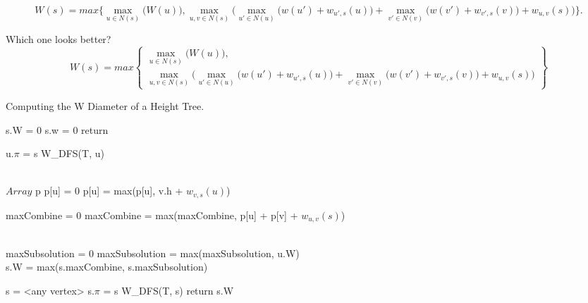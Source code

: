 $$ W(s) = max\Bigg\{ \max\limits_{u \in N(s)}\bigg(W(u)\bigg), \max\limits_{u, v \in N(s)}\bigg( \max\limits_{u' \in N(u)}\Big(w(u') + w_{u', s}(u)\Big) + \max\limits_{v' \in N(v)}\Big(w(v') + w_{v', s}(v)\Big) + w_{u, v}(s)\bigg) \Bigg\}. $$


Which one looks better?
$$
W(s) = max
\left\{
	\begin{array}{ll}
                \max\limits_{u \in N(s)}\bigg(W(u)\bigg),\\
                \max\limits_{u, v \in N(s)}\bigg( \max\limits_{u' \in N(u)}\Big(w(u') + w_{u', s}(u)\Big) + \max\limits_{v' \in N(v)}\Big(w(v') + w_{v', s}(v)\Big) + w_{u, v}(s)\bigg)
	\end{array}
\right\}
$$

\begin{algorithm}
\caption{Computing the W Diameter of a Height Tree.}

\begin{algorithmic}[1]


        \State s.W = 0
        \State s.w = 0
        \State return
    \EndIf

            \State u.$\pi$ = s
            \State W\_DFS(T, u)
        \EndIf
    \EndFor

    \\
    \State $Array$ p
        \State p[u] = 0
            \State p[u] = max(p[u], v.h + $w_{v, s}(u)$) 
        \EndFor
    \EndFor

    \State maxCombine = 0
        \State maxCombine = max(maxCombine, p[u] + p[v] + $w_{u, v}(s)$)
        \EndFor
    \EndFor

    \\
    \State maxSubsolution = 0
        \State maxSubsolution = max(maxSubsolution, u.W)
    \EndFor
    \\
    \State s.W = max(s.maxCombine, s.maxSubsolution)

\EndFunction

    \State s = <any vertex>
    \State s.$\pi$ = s
    \State W\_DFS(T, s)
    \State return s.W
\EndFunction

\end{algorithmic}
\end{algorithm}

